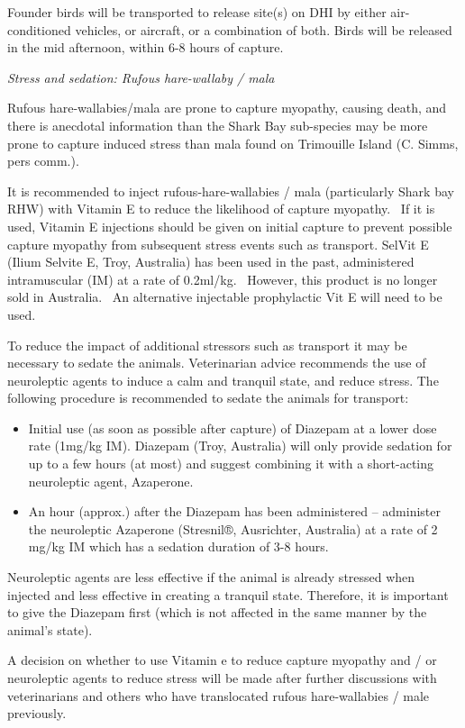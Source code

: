 \documentclass[version=last,
    paper=a4,                               %
    10pt,                                   %
    dvipsnames,
    oneside,                              %
    headings=openany,                       %
    open=any,
    BCOR=7mm,                               %
    DIV=15,     %
]{scrbook}
\providecommand{\tightlist}{\setlength{\itemsep}{0pt}\setlength{\parskip}{0pt}}
\begin{document}
Founder birds will be transported to release site(s) on DHI by either
air-conditioned vehicles, or aircraft, or a combination of both. Birds
will be released in the mid afternoon, within 6-8 hours of capture.

\emph{Stress and sedation: Rufous hare-wallaby / mala}

Rufous hare-wallabies/mala are prone to capture myopathy, causing death,
and there is anecdotal information than the Shark Bay sub-species may be
more prone to capture induced stress than mala found on Trimouille
Island (C. Simms, pers comm.).~

It is recommended to inject rufous-hare-wallabies / mala (particularly
Shark bay RHW) with Vitamin E to reduce the likelihood of capture
myopathy. ~If it is used, Vitamin E injections should be given on
initial capture to prevent possible capture myopathy from subsequent
stress events such as transport. SelVit E (Ilium Selvite E, Troy,
Australia) has been used in the past, administered intramuscular (IM) at
a rate of 0.2ml/kg.~ However, this product is no longer sold in
Australia.~ An alternative injectable prophylactic Vit E will need to be
used.

To reduce the impact of additional stressors such as transport it may be
necessary to sedate the animals. Veterinarian advice recommends the use
of neuroleptic agents to induce a calm and tranquil state, and reduce
stress. The following procedure is recommended to sedate the animals for
transport:

\begin{itemize}
\tightlist
\item
  Initial use (as soon as possible after capture) of Diazepam at a lower
  dose rate (1mg/kg IM). Diazepam (Troy, Australia) will only provide
  sedation for up to a few hours (at most) and suggest combining it with
  a short-acting neuroleptic agent, Azaperone.~
\item
  An hour (approx.) after the Diazepam has been administered --
  administer the neuroleptic Azaperone (Stresnil®, Ausrichter,
  Australia) at a rate of 2 mg/kg IM which has a sedation duration of
  3-8 hours.
\end{itemize}

Neuroleptic agents are less effective if the animal is already stressed
when injected and less effective in creating a tranquil state.
Therefore, it is important to give the Diazepam first (which is not
affected in the same manner by the animal's state).

A decision on whether to use Vitamin e to reduce capture myopathy and /
or neuroleptic agents to reduce stress will be made after further
discussions with veterinarians and others who have translocated rufous
hare-wallabies / male previously.
\end{document}
